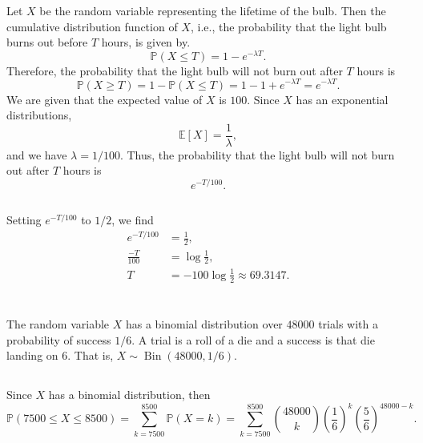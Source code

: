 \documentclass[12pt]{article}
\renewcommand{\P}{\mathbb{P}}
\newcommand{\E}{\mathbb{E}}
\newcommand{\Bin}{\operatorname{Bin}}
\begin{document}
Let $X$ be the random variable representing the lifetime of the bulb. Then the cumulative distribution function of $X$, i.e., the probability that the light bulb burns out before $T$ hours, is given by.
\[
    \P(X \leq T) = 1 - e^{-\lambda T}.
\]
Therefore, the probability that the light bulb will not burn out after $T$ hours is
\[
    \P(X \geq T) = 1 - \P(X \leq T) = 1 - 1 + e^{-\lambda T} = e^{-\lambda T}.
\]
We are given that the expected value of $X$ is $100$. Since $X$ has an exponential distributions,
\[
    \E[X] = \frac1\lambda,
\]
and we have $\lambda = 1/100$. Thus,  the probability that the light bulb will not burn out after $T$ hours is
\[
    e^{-T/100}.
\]

\subsection{}

Setting $e^{-T/100}$ to $1/2$, we find
\begin{align*}
    e^{-T/100} &= \frac12, \\
    \frac{-T}{100} &= \log\frac12, \\
    T &= -100 \log \frac12 \approx 69.3147.
\end{align*}


\newpage
\section{}

\subsection{}

The random variable $X$ has a binomial distribution over $48000$ trials with a probability of success $1/6$. A trial is a roll of a die and a success is that die landing on $6$. That is, $X \sim \Bin(48000, 1/6)$.

\subsection{}

Since $X$ has a binomial distribution, then
\[
    \P(7500 \leq X \leq 8500) 
        = \sum_{k = 7500}^{8500} \P(X = k) 
        = \sum_{k = 7500}^{8500} \binom{48000}{k} \left( \frac16 \right)^k \left( \frac56 \right)^{48000-k}. 
\]

\subsection{}
\end{document}
